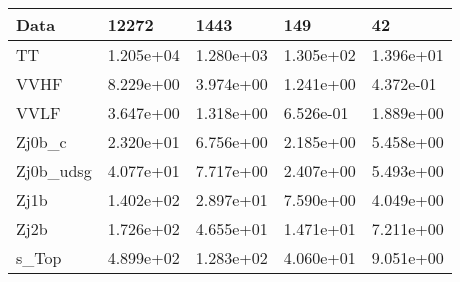 \begin{table}
{\begin{tabularx}{\textwidth}{|X|X|X|X|X|}
\hline
Data & 12272 & 1443 & 149 & 42 \\
\hline
TT & 1.205e+04 & 1.280e+03 & 1.305e+02 & 1.396e+01 \\
VVHF & 8.229e+00 & 3.974e+00 & 1.241e+00 & 4.372e-01 \\
VVLF & 3.647e+00 & 1.318e+00 & 6.526e-01 & 1.889e+00 \\
Zj0b\_c & 2.320e+01 & 6.756e+00 & 2.185e+00 & 5.458e+00 \\
Zj0b\_udsg & 4.077e+01 & 7.717e+00 & 2.407e+00 & 5.493e+00 \\
Zj1b & 1.402e+02 & 2.897e+01 & 7.590e+00 & 4.049e+00 \\
Zj2b & 1.726e+02 & 4.655e+01 & 1.471e+01 & 7.211e+00 \\
s\_Top & 4.899e+02 & 1.283e+02 & 4.060e+01 & 9.051e+00 \\
\hline
\end{tabularx}
}
\label{tab:cr-Zee-2016}
\end{table}

